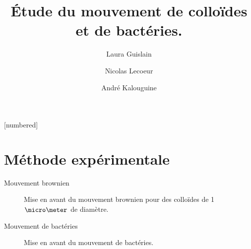 \documentclass[11pt]{beamer}
\begin{document}
	\author{Laura Guislain \and Nicolas Lecoeur \and André Kalouguine}
	\title{Étude du mouvement de colloïdes et de bactéries.}
	\subject{Caractérisation du mouvement bactérien et comparaison au mouvement brownien.}
	[numbered]
\begin{frame}[plain]
	\maketitle
\end{frame}
\addtocounter{framenumber}{-1}


\section{Méthode expérimentale}

\begin{frame}{Mouvement brownien}
\renewcommand{\figurename}{Film}
\begin{figure}
	\centering
    \caption{Mise en avant du mouvement brownien pour des colloïdes de 1$\micro \meter$ de diamètre.}
    \label{fig:movie_col}
\end{figure}
\end{frame}

\begin{frame}{Mouvement de bactéries}
\begin{figure}
\renewcommand{\figurename}{Film}
	\centering
	\caption{Mise en avant du mouvement de bactéries.}
	\label{fig:movie_bac}
\end{figure}
\end{frame}
\end{document}
